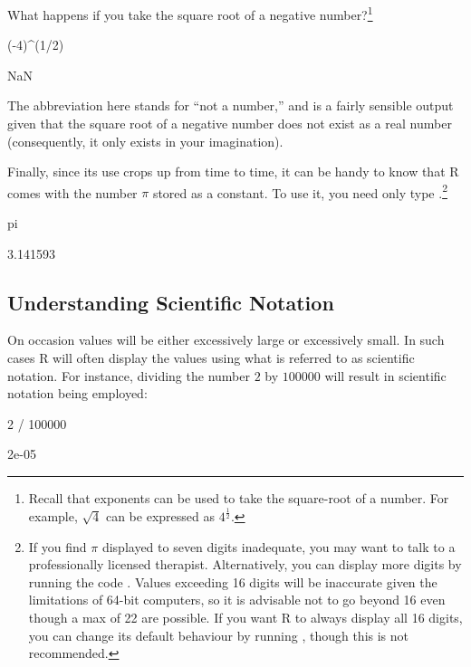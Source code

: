 What happens if you take the square root of a negative number?\footnote{Recall that exponents can be used to take the square-root of a number.  For example, $\sqrt{4}$ can be expressed as $4^\frac{1}{2}$.}

\begin{inR}
(-4)^(1/2)
\end{inR}
\begin{outR}
[1] NaN
\end{outR}

The abbreviation  here stands for ``not a number,'' and is a fairly sensible output given that the square root of a negative number does not exist as a real number (consequently, it only exists in your imagination).

Finally, since its use crops up from time to time, it can be handy to know that R comes with the number $\pi$ stored as a constant. To use it, you need only type .\footnote{If you find $\pi$ displayed to seven digits inadequate, you may want to talk to a professionally licensed therapist. Alternatively, you can display more digits by running the code . Values exceeding 16 digits will be inaccurate given the limitations of 64-bit computers, so it is advisable not to go beyond 16 even though a max of 22 are possible. If you want R to always display all 16 digits, you can change its default behaviour by running , though this is not recommended.}

\begin{inR}
pi
\end{inR}
\begin{outR}
[1] 3.141593
\end{outR}

\subsection{Understanding Scientific Notation}

On occasion values will be either excessively large or excessively small. In such cases R will often display the values using what is referred to as \gls{scientific notation}.  For instance, dividing the number $2$ by $100000$ will result in scientific notation being employed:

\begin{inR}
2 / 100000
\end{inR}
\begin{outR}
[1] 2e-05
\end{outR}

